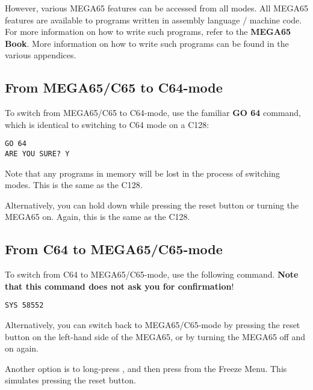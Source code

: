 However, various MEGA65
features can be accessed from all modes.  All MEGA65 features are available
to programs written in assembly language / machine code.
\ifdefined\printmanual
For more information on how to write such programs, refer to the {\bf MEGA65 Book}.
\else
More information on how to write such programs can be found in the various appendices.
\fi

\subsection{From MEGA65/C65 to C64-mode}

To switch from MEGA65/C65 to C64-mode, use the familiar {\bf GO 64} command, which is identical to switching to C64
mode on a C128:

\begin{tcolorbox}[colback=black,coltext=white]
\verbatimfont{\codefont}
\begin{verbatim}
GO 64
ARE YOU SURE? Y
\end{verbatim}
\end{tcolorbox}

Note that any programs in memory will be lost in the process of switching modes. This is the same as the C128.

Alternatively, you can hold \megasymbolkey down while pressing the reset button or turning the MEGA65 on. Again,
this is the same as the C128.

\subsection{From C64 to MEGA65/C65-mode}

To switch from C64 to MEGA65/C65-mode, use the following command. {\bf Note that this command does not ask you for
confirmation}!

\begin{tcolorbox}[colback=black,coltext=white]
\verbatimfont{\codefont}
\begin{verbatim}
SYS 58552
\end{verbatim}
\end{tcolorbox}

Alternatively, you can switch back to MEGA65/C65-mode by pressing the reset
button on the left-hand side of the MEGA65, or by turning the
MEGA65 off and on again.

Another option is to long-press , and then press 
from the Freeze Menu.  This simulates pressing the reset button.

